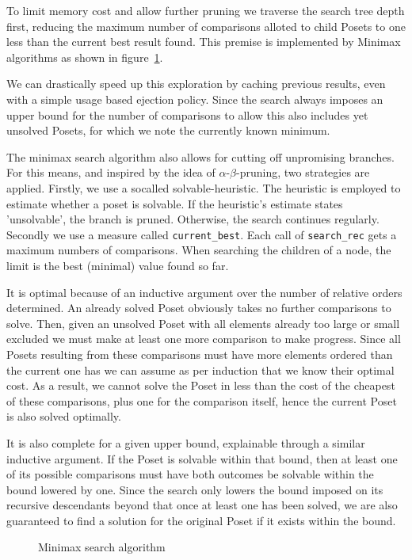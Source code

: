 \documentclass[10pt,journal,compsoc]{IEEEtran}
\begin{document}
To limit memory cost and allow further pruning we traverse the search tree depth first, reducing the
maximum number of comparisons alloted to child Posets to one less than the current best result
found. This premise is implemented by Minimax algorithms as shown in
figure~\ref{fig:minimax_search}.

We can drastically speed up this exploration by caching previous results, even with a simple usage
based ejection policy. Since the search always imposes an upper bound for the number of comparisons
to allow this also includes yet unsolved Posets, for which we note the currently known minimum.

The minimax search algorithm also allows for cutting off unpromising branches. For this means, and inspired by the idea of $\alpha$-$\beta$-pruning, two strategies are applied.
Firstly, we use a socalled solvable-heuristic.
The heuristic is employed to estimate whether a poset is solvable. If the heuristic's estimate states 'unsolvable', the branch is pruned.
Otherwise, the search continues regularly.
Secondly we use a measure called \texttt{current\_best}.
Each call of \texttt{search\_rec} gets a maximum numbers of comparisons. When searching the children of a node, the limit is the best (minimal) value found so far.

It is optimal because of an inductive argument over the number of relative orders determined. An
already solved Poset obviously takes no further comparisons to solve. Then, given an unsolved Poset
with all elements already too large or small excluded we must make at least one more comparison to
make progress. Since all Posets resulting from these comparisons must have more elements ordered
than the current one has we can assume as per induction that we know their optimal cost. As a result, we
cannot solve the Poset in less than the cost of the cheapest of these comparisons, plus one for the
comparison itself, hence the current Poset is also solved optimally.

It is also complete for a given upper bound, explainable through a similar inductive argument. If
the Poset is solvable within that bound, then at least one of its possible comparisons must have both
outcomes be solvable within the bound lowered by one. Since the search only lowers the bound imposed
on its recursive descendants beyond that once at least one has been solved, we are also guaranteed
to find a solution for the original Poset if it exists within the bound.

\begin{figure}
  
  \caption{Minimax search algorithm}
  \label{fig:minimax_search}
\end{figure}
\end{document}
